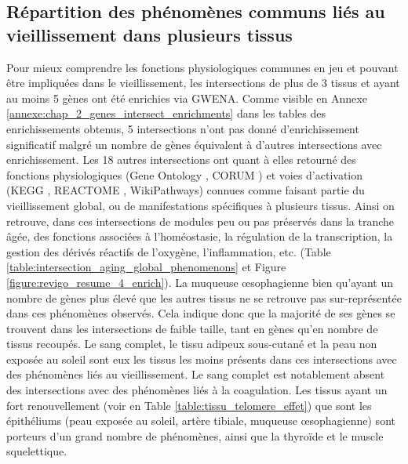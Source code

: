 \subsection{Répartition des phénomènes communs liés au vieillissement dans plusieurs tissus}

Pour mieux comprendre les fonctions physiologiques communes en jeu et pouvant être impliquées dans le vieillissement, les intersections de plus de 3 tissus et ayant au moins 5 gènes ont été enrichies via GWENA. Comme visible en Annexe \ref{annexe:chap_2_genes_intersect_enrichments} dans les tables des enrichissements obtenus, 5 intersections n'ont pas donné d'enrichissement significatif malgré un nombre de gènes équivalent à d'autres intersections avec enrichissement. Les 18 autres intersections ont quant à elles retourné des fonctions physiologiques (Gene Ontology , CORUM ) et voies d'activation (KEGG , REACTOME , WikiPathways) connues comme faisant partie du vieillissement global, ou de manifestations spécifiques à plusieurs tissus. Ainsi on retrouve, dans ces intersections de modules peu ou pas préservés dans la tranche âgée, des fonctions associées à l'homéostasie, la régulation de la transcription, la gestion des dérivés réactifs de l'oxygène, l'inflammation, etc. (Table \ref{table:intersection_aging_global_phenomenons} et Figure \ref{figure:revigo_resume_4_enrich}). La muqueuse œsophagienne bien qu'ayant un nombre de gènes plus élevé que les autres tissus ne se retrouve pas sur-représentée dans ces phénomènes observés. Cela indique donc que la majorité de ses gènes se trouvent dans les intersections de faible taille, tant en gènes qu'en nombre de tissus recoupés. Le sang complet, le tissu adipeux sous-cutané et la peau non exposée au soleil sont eux les tissus les moins présents dans ces intersections avec des phénomènes liés au vieillissement. Le sang complet est notablement absent des intersections avec des phénomènes liés à la coagulation. Les tissus ayant un fort renouvellement (voir en Table \ref{table:tissu_telomere_effet}) que sont les épithéliums (peau exposée au soleil, artère tibiale, muqueuse œsophagienne) sont porteurs d'un grand nombre de phénomènes, ainsi que la thyroïde et le muscle squelettique. 


